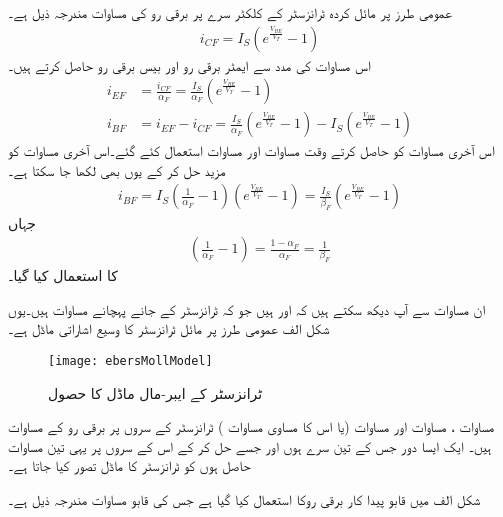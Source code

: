 عمومی طرز پر مائل کردہ  ٹرانزسٹر کے کلکٹر  سرے پر برقی رو کی مساوات مندرجہ ذیل ہے۔
\begin{align} \label{مساوات_ٹرانزسٹر_کلکٹر _سیدھی_رو}
i_{CF}=I_S \left (e^{\frac{V_{BE}}{V_T}}-1 \right )
\end{align}
اس مساوات کی مدد سے ایمٹر برقی رو   اور بیس برقی رو  حاصل کرتے ہیں۔
\begin{align}
i_{EF}&=\frac{i_{CF}}{\alpha_F}=\frac{I_S}{\alpha_F} \left (e^{\frac{V_{BE}}{V_T}}-1 \right ) 
\label{مساوات_ٹرانزسٹر_مخارج_سیدھی_رو}  \\
i_{BF}&=i_{EF}-i_{CF}=\frac{I_S}{\alpha_F} \left (e^{\frac{V_{BE}}{V_T}}-1 \right )-I_S \left (e^{\frac{V_{BE}}{V_T}}-1 \right ) \label{مساوات_ٹرانزسٹر_قابو_سیدھی_رو_الف}
\end{align}
اس آخری مساوات کو حاصل کرتے وقت مساوات   اور مساوات   استعمال کئے گئے۔اس آخری مساوات کو مزید حل کر کے یوں بھی لکھا جا سکتا ہے۔
\begin{align} \label{مساوات_ٹرانزسٹر_قابو_سیدھی_رو}
i_{BF}=I_S \left (\frac{1}{\alpha_F}-1 \right ) \left (e^{\frac{V_{BE}}{V_T}}-1 \right )=\frac{I_S}{\beta_F} \left (e^{\frac{V_{BE}}{V_T}}-1 \right )
\end{align}
جہاں
\begin{align}
\left (\frac{1}{\alpha_F}-1 \right )=\frac{1-\alpha_F}{\alpha_F}=\frac{1}{\beta_F}
\end{align}
کا استعمال کیا گیا۔

ان مساوات سے آپ دیکھ سکتے ہیں کہ اور ہیں جو کہ ٹرانزسٹر کے جانے پہچانے مساوات ہیں۔یوں شکل  الف عمومی طرز پر مائل   ٹرانزسٹر کا وسیع اشاراتی ماڈل ہے۔
\begin{figure}
\centering
\texttt{[image: ebersMollModel]}
\caption{ ٹرانزسٹر کے ایبر-مال ماڈل کا حصول}
\label{شکل_ایبر_مال_ماڈل}
\end{figure}
مساوات  ، مساوات   اور مساوات   (یا اس کا مساوی مساوات   ) ٹرانزسٹر کے سروں پر برقی رو کے مساوات ہیں۔ ایک ایسا دور جس کے تین سرے ہوں اور جسے حل کر کے اس کے سروں پر یہی تین مساوات حاصل ہوں کو ٹرانزسٹر کا ماڈل تصور کیا جاتا ہے۔

شکل  الف میں قابو پیدا کار برقی روکا استعمال کیا گیا ہے جس کی قابو مساوات مندرجہ ذیل ہے۔

